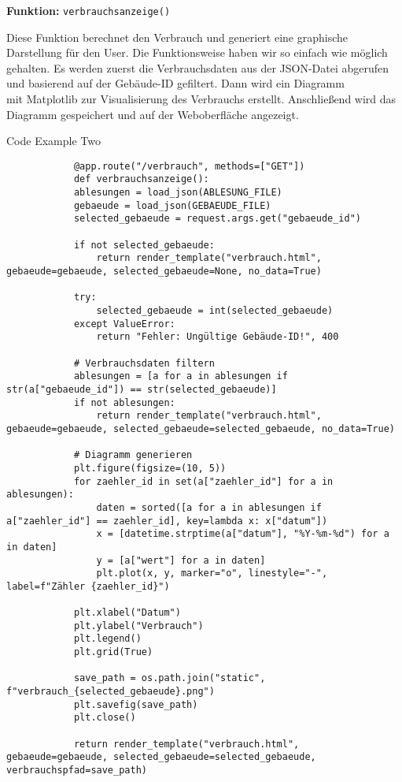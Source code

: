 \textbf{Funktion: }\texttt{verbrauchsanzeige()}

Diese Funktion berechnet den Verbrauch und generiert eine graphische Darstellung für den User.
Die Funktionsweise haben wir so einfach wie möglich gehalten. Es werden zuerst die Verbrauchsdaten aus der JSON-Datei abgerufen und basierend auf der Gebäude-ID gefiltert. Dann wird ein Diagramm\\
mit Matplotlib zur Visualisierung des Verbrauchs erstellt. Anschließend wird das Diagramm gespeichert und auf der Weboberfläche angezeigt.\par

\begin{frame}{Code Example Two}
    \begin{verbatim}
            @app.route("/verbrauch", methods=["GET"])
            def verbrauchsanzeige():
            ablesungen = load_json(ABLESUNG_FILE)
            gebaeude = load_json(GEBAEUDE_FILE)
            selected_gebaeude = request.args.get("gebaeude_id")

            if not selected_gebaeude:
                return render_template("verbrauch.html", gebaeude=gebaeude, selected_gebaeude=None, no_data=True)

            try:
                selected_gebaeude = int(selected_gebaeude)
            except ValueError:
                return "Fehler: Ungültige Gebäude-ID!", 400

            # Verbrauchsdaten filtern
            ablesungen = [a for a in ablesungen if str(a["gebaeude_id"]) == str(selected_gebaeude)]
            if not ablesungen:
                return render_template("verbrauch.html", gebaeude=gebaeude, selected_gebaeude=selected_gebaeude, no_data=True)

            # Diagramm generieren
            plt.figure(figsize=(10, 5))
            for zaehler_id in set(a["zaehler_id"] for a in ablesungen):
                daten = sorted([a for a in ablesungen if a["zaehler_id"] == zaehler_id], key=lambda x: x["datum"])
                x = [datetime.strptime(a["datum"], "%Y-%m-%d") for a in daten]
                y = [a["wert"] for a in daten]
                plt.plot(x, y, marker="o", linestyle="-", label=f"Zähler {zaehler_id}")

            plt.xlabel("Datum")
            plt.ylabel("Verbrauch")
            plt.legend()
            plt.grid(True)

            save_path = os.path.join("static", f"verbrauch_{selected_gebaeude}.png")
            plt.savefig(save_path)
            plt.close()

            return render_template("verbrauch.html", gebaeude=gebaeude, selected_gebaeude=selected_gebaeude, verbrauchspfad=save_path)
    \end{verbatim}
\end{frame}

